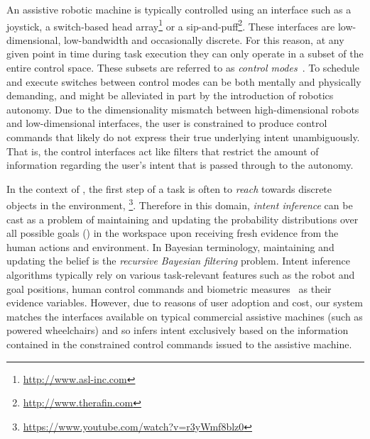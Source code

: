 \documentclass[letterpaper, 10 pt, conference]{ieeeconf}  %
\begin{document}
An assistive robotic machine is typically controlled using an interface such as a joystick, a switch-based head array\footnote{ \url{http://www.asl-inc.com}} or a sip-and-puff\footnote{ \url{ http://www.therafin.com}}. These interfaces are low-dimensional, low-bandwidth and occasionally discrete. For this reason, at any given point in time during task execution they can only operate in a subset of the entire control space. These subsets are referred to as \textit{control modes}~\cite{simpson2008tooth}. To schedule and execute switches between control modes can be both mentally and physically demanding, and might be alleviated in part by the introduction of robotics autonomy.  Due to the dimensionality mismatch between high-dimensional robots and low-dimensional interfaces, the user is constrained to produce control commands that likely do not express their true underlying intent unambiguously. That is, the control interfaces act like filters that restrict the amount of information regarding the user's intent that is passed through to the autonomy. 

In the context of , the first step of a task is often to \textit{reach} towards discrete objects in the environment, \footnote{\url{https://www.youtube.com/watch?v=r3yWmf8blz0}}. Therefore in this domain, \textit{intent inference} can be cast as a problem of maintaining and updating the probability distributions over all possible goals () in the workspace upon receiving fresh evidence from the human actions and environment. In Bayesian terminology, maintaining and updating the belief is the \textit{recursive Bayesian filtering} problem. Intent inference algorithms typically rely on various task-relevant features such as the robot and goal positions, human control commands and biometric measures~\cite{croft2003estimating} as their evidence variables. However, due to reasons of user adoption and cost, our system matches the interfaces available on typical commercial assistive machines (such as powered wheelchairs) and so infers intent exclusively based on the information contained in the constrained control commands issued to the assistive machine. 
\end{document}
